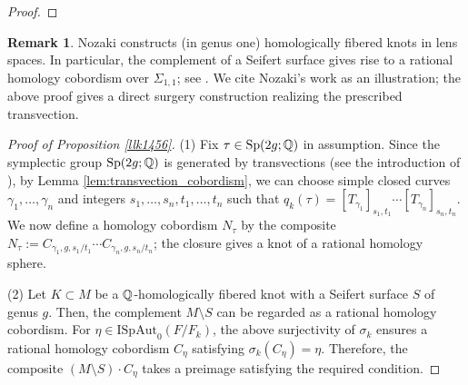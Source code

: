 \documentclass{article}
\theoremstyle{plain}
\theoremstyle{definition}
\newtheorem{rem}[thm]{Remark}
\newcommand{\ra}{\rightarrow}
\newcommand{\Q}{{\Bbb Q}}
\newcommand{\Z}{{\Bbb Z}}
\newcommand{\Sp}{{\rm Sp}}
\begin{document}
{\begin{proof}
\end{proof}

\begin{rem}
Nozaki \cite{Nozaki} constructs (in genus one) homologically fibered knots in lens spaces.
In particular, the complement of a Seifert surface gives rise to a rational homology cobordism over $\Sigma_{1,1}$; see \cite[Figure~2.1, Lemma~2.4]{Nozaki}.
We cite Nozaki's work as an illustration; the above proof gives a direct surgery construction realizing the prescribed transvection.
\end{rem}




\begin{proof}[Proof of Proposition \ref{llk1456}]
(1) Fix $\tau \in \Sp(2g;\Q) $ in assumption.
Since the symplectic group $\Sp(2g;\Q) $ is generated by transvections (see the introduction of \cite{Ch}), by Lemma \ref{lem:transvection_cobordism}, we can choose simple closed curves $\gamma_1, \dots, \gamma_n$ and integers $s_1,\dots, s_n , t_1,\dots, t_n$ such that $ q_k(\tau) =[T_{\gamma_1} ]_{s_1,t_1} \cdots [T_{\gamma_n} ]_{s_n,t_n}.$
We now define a homology cobordism $N_{\tau} $ by the composite
$ N_{\tau}:= C_{ \gamma_1 ,g,s_1/t_1} \cdots C_{ \gamma_n,g,s_n/t_n} $; the closure gives a knot of a rational homology sphere.


(2) Let $ K \subset M$ be a $\Q$-homologically fibered knot with a Seifert surface $S$ of genus $g$.
Then, the complement $M \setminus S$ can be regarded as a rational homology cobordism.
For $ \eta \in \mathrm{ISpAut}_0(F/F_k)$, the above surjectivity of $\sigma_k$ ensures a rational homology cobordism $C_{\eta}$ satisfying $\sigma_k(C_{\eta})= \eta $.
Therefore, the composite $(M \setminus S ) \cdot C_{\eta}$ takes a preimage satisfying the required condition.
\end{proof}




}
\end{document}
